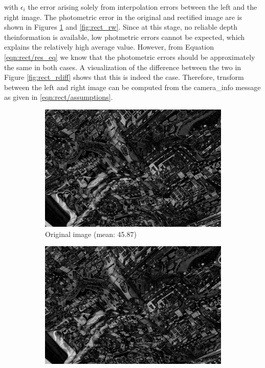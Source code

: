 with $\epsilon_i$ the error arising solely from interpolation errors between the
left and the right image.
The photometric error in the original and rectified image are is shown in Figures
\ref{fig:rect_ru} and \ref{fig:rect_rw}. Since at this stage, no reliable depth
theinformation is available, low photmetric errors cannot be expected, which explains 
the relatively high average value. However, from Equation \ref{eqn:rect/res_eq}
we know that the photometric errors should be approximately the same in both
cases. A visualization of the difference between the two in Figure \ref{fig:rect_rdiff} 
shows that this is indeed the case. Therefore, trnsform between the left and
right image can be computed from the camera\_info message as given in
\ref{eqn:rect/assumptions}.

\begin{figure}[h]
  \centering
  \begin{subfigure}[b]{0.49\textwidth}
    \includegraphics[width=\textwidth]{figures/rect_ru.jpg} 
    \caption{Original image (mean: 45.87)}
    \label{fig:rect_ru}
  \end{subfigure}
  \begin{subfigure}[b]{0.49\textwidth}
    \includegraphics[width=\textwidth]{figures/rect_rw.jpg} 

\end{subfigure}
\end{figure}
